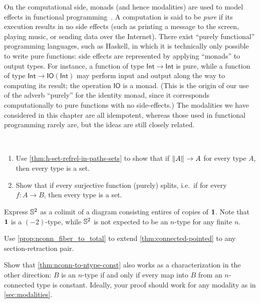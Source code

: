 On the computational side, monads (and hence modalities) are used to model effects in functional programming~\cite{Moggi89}.
A computation is said to be \emph{pure} if its execution results in no side effects (such as printing a message to the screen, playing music, or sending data over the Internet).
There exist ``purely functional'' programming languages, such as Haskell, in which it is technically only possible to write pure functions: side effects are represented by applying ``monads'' to output types.
For instance, a function of type $\mathsf{Int}\to\mathsf{Int}$ is pure, while a function of type $\mathsf{Int}\to \mathsf{IO}(\mathsf{Int})$ may perform input and output along the way to computing its result; the operation $\mathsf{IO}$ is a monad.
%
(This is the origin of our use of the adverb ``purely'' for the identity monad, since it corresponds computationally to pure functions with no side-effects.)
The modalities we have considered in this chapter are all idempotent, whereas those used in functional programming rarely are, but the ideas are still closely related.


\sectionExercises

\begin{ex}\ 
  \begin{enumerate}
    \item Use \autoref{thm:h-set-refrel-in-paths-sets} to show 
    that if $\mathopen{}\left\Vert A\right\Vert_{}\mathclose{}\to A$ for every type $A$, 
    then every type is a set.
    \item Show that if every surjective function (purely) splits, 
    i.e.~if
    for every $f:A\to B$, then every type is a set.
  \end{enumerate}
\end{ex}

\begin{ex}\label{ex:s2-colim-unit}
  Express $\mathbb{S}^2$ as a colimit of a diagram consisting entires of copies of $\mathbf{1}$.
  Note that $\mathbf{1}$ is a $(-2)$-type, while $\mathbb{S}^2$ is not expected to be an $n$-type for any finite $n$.
\end{ex}

\begin{ex}
  Use \autoref{prop:nconn_fiber_to_total} to extend \autoref{thm:connected-pointed} to any section-retraction pair.
\end{ex}

\begin{ex}\label{ex:ntype-from-nconn-const}
  Show that \autoref{thm:nconn-to-ntype-const} also works as a characterization in the other direction: $B$ is an $n$-type if and only if every map into $B$ from an $n$-con\-nect\-ed type is constant.
  Ideally, your proof should work for any modality as in \autoref{sec:modalities}.
\end{ex}

